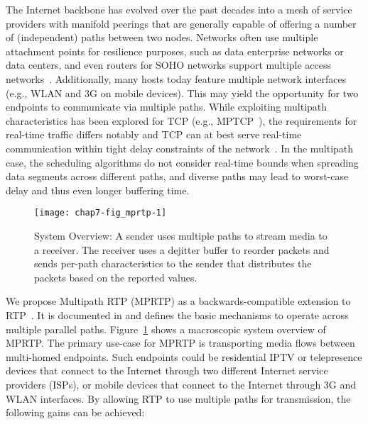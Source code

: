 The Internet backbone has evolved over the past decades into a mesh of service
providers with manifold peerings that are generally capable of offering a
number of (independent) paths between two nodes. Networks often use multiple
attachment points for resilience purposes, such as data enterprise networks or
data centers, and even routers for SOHO networks support multiple access
networks~\cite{draft.fun.multi, draft.homenet.arch}. Additionally, many hosts
today feature multiple network interfaces (e.g., WLAN and 3G on mobile
devices). This may yield the opportunity for two endpoints to communicate via
multiple paths. While exploiting multipath characteristics
\cite{Wischik:2008:RPP} has been explored for TCP (e.g.,
MPTCP~\cite{rfc6824}), the requirements for real-time traffic differs notably
and TCP can at best serve real-time communication within tight delay
constraints of the network~\cite{Brosh:tcp-real-time}. In the multipath case,
the scheduling algorithms do not consider real-time bounds when spreading data
segments across different paths, and diverse paths may lead to worst-case delay
and thus even longer buffering time.

\begin{figure}
\centerline {
\texttt{[image: chap7-fig\_mprtp-1]}
}
\caption{System Overview: A sender uses multiple paths to stream media
  to a receiver.  The receiver uses a dejitter buffer to reorder
  packets and sends per-path characteristics to the sender that
  distributes the packets based on the reported values.}
\label{chap7:fig_mprtp}
\end{figure}

We propose Multipath RTP (MPRTP) as a backwards-compatible extension to
RTP~\cite{rfc3550}. It is documented in \cite{draft.mprtp} and defines the
basic mechanisms to operate across multiple parallel paths.
Figure~\ref{chap7:fig_mprtp} shows a macroscopic system overview of MPRTP. The
primary use-case for MPRTP is transporting media flows between multi-homed
endpoints. Such endpoints could be residential IPTV or telepresence devices
that connect to the Internet through two different Internet service providers
(ISPs), or mobile devices that connect to the Internet through 3G and WLAN
interfaces. By allowing RTP to use multiple paths for transmission, the
following gains can be achieved:

